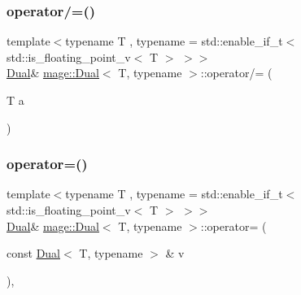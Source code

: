 \subsubsection{\texorpdfstring{operator/=()}{operator/=()}\hspace{0.1cm}{\footnotesize\ttfamily [2/2]}}
{\footnotesize\ttfamily template$<$typename T , typename  = std\+::enable\+\_\+if\+\_\+t$<$ std\+::is\+\_\+floating\+\_\+point\+\_\+v$<$ T $>$ $>$$>$ \\
\mbox{\hyperlink{structmage_1_1_dual}{Dual}}\& \mbox{\hyperlink{structmage_1_1_dual}{mage\+::\+Dual}}$<$ T, typename $>$\+::operator/= (\begin{DoxyParamCaption}\item[{T}]{a }\end{DoxyParamCaption})\hspace{0.3cm}{\ttfamily [noexcept]}}

\mbox{\label{structmage_1_1_dual_a042226b70272f46ec28dcb4cd51be3f8}} 
\subsubsection{\texorpdfstring{operator=()}{operator=()}\hspace{0.1cm}{\footnotesize\ttfamily [1/2]}}
{\footnotesize\ttfamily template$<$typename T , typename  = std\+::enable\+\_\+if\+\_\+t$<$ std\+::is\+\_\+floating\+\_\+point\+\_\+v$<$ T $>$ $>$$>$ \\
\mbox{\hyperlink{structmage_1_1_dual}{Dual}}\& \mbox{\hyperlink{structmage_1_1_dual}{mage\+::\+Dual}}$<$ T, typename $>$\+::operator= (\begin{DoxyParamCaption}\item[{const \mbox{\hyperlink{structmage_1_1_dual}{Dual}}$<$ T, typename $>$ \&}]{v }\end{DoxyParamCaption})\hspace{0.3cm}{\ttfamily [default]}, {\ttfamily [noexcept]}}

\mbox{\label{structmage_1_1_dual_af584cd034bb1ab0e17746d3d2ab6f49d}} 
